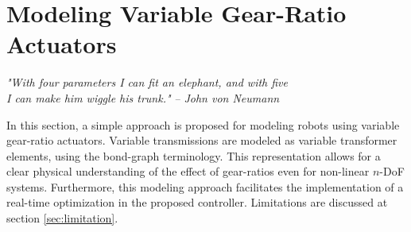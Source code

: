 



\newpage

\section{Modeling Variable Gear-Ratio Actuators}
\label{sec:model}

\begin{flushright}
{%
\textit{"With four parameters I can fit an elephant, and with five \\ I can make him wiggle his trunk."}
 }
 \emph{-- John von Neumann}
\end{flushright}
\vspace{+10pt}

In this section, a simple approach is proposed for modeling robots using variable gear-ratio actuators. Variable transmissions are modeled as variable transformer elements, using the bond-graph terminology. This representation allows for a clear physical understanding of the effect of gear-ratios even for non-linear $n$-DoF systems. Furthermore, this modeling approach facilitates the implementation of a real-time optimization in the proposed controller. Limitations are discussed at section \ref{sec:limitation}.

